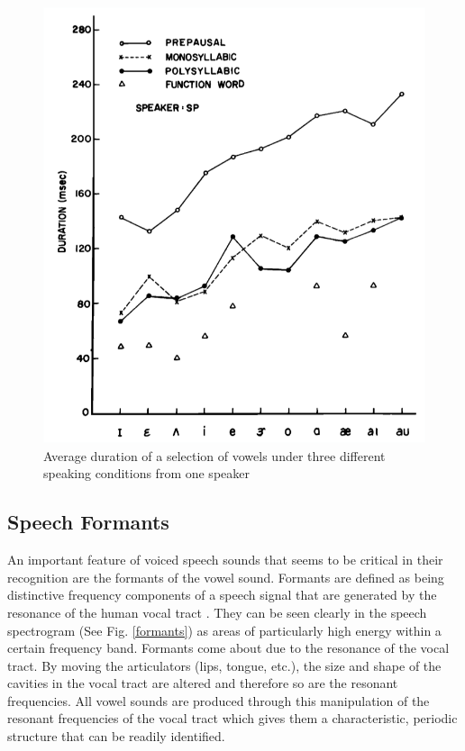 \documentclass[titlepage]{article}
\begin{document}
    \begin{figure}
      \centering
      \includegraphics[scale=0.3]{vowelDuration}
      \caption{Average duration of a selection of vowels under three different
      speaking conditions from one speaker \cite{Umeda1975}}
      \label{vowelDuration}
    \end{figure}

  \subsection{Speech Formants}

    An important feature of voiced speech sounds that seems to be critical in their
    recognition are the formants of the vowel sound. Formants are defined as being distinctive
    frequency components of a speech signal that are generated by the resonance
    of the human vocal tract \cite{Denes1993}. They can be seen clearly in the speech spectrogram
    (See Fig. \ref{formants}) as areas of particularly high energy within a certain frequency band.
    Formants come about due to the resonance of the vocal tract. By moving the articulators
    (lips, tongue, etc.), the size and shape of the cavities in the vocal tract are altered and
    therefore so are the resonant frequencies. All vowel sounds are produced through this manipulation
    of the resonant frequencies of the vocal tract which gives them a characteristic, periodic
    structure that can be readily identified.
\end{document}
